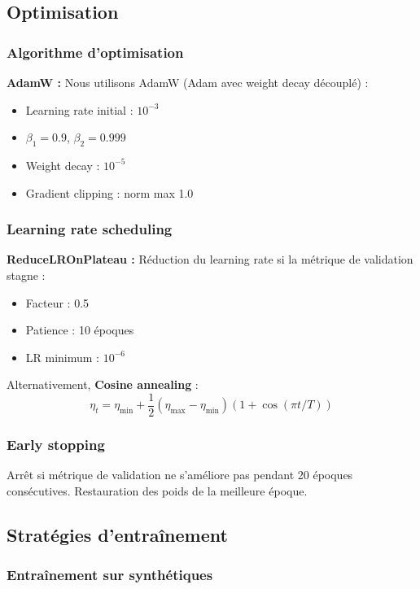 \subsection{Optimisation}

\subsubsection{Algorithme d'optimisation}

\textbf{AdamW :}
Nous utilisons AdamW (Adam avec weight decay découplé) :
\begin{itemize}
    \item Learning rate initial : $10^{-3}$
    \item $\beta_1 = 0.9$, $\beta_2 = 0.999$
    \item Weight decay : $10^{-5}$
    \item Gradient clipping : norm max 1.0
\end{itemize}

\subsubsection{Learning rate scheduling}

\textbf{ReduceLROnPlateau :}
Réduction du learning rate si la métrique de validation stagne :
\begin{itemize}
    \item Facteur : 0.5
    \item Patience : 10 époques
    \item LR minimum : $10^{-6}$
\end{itemize}

Alternativement, \textbf{Cosine annealing} :
\[
\eta_t = \eta_{\min} + \frac{1}{2}(\eta_{\max} - \eta_{\min})(1 + \cos(\pi t / T))
\]

\subsubsection{Early stopping}

Arrêt si métrique de validation ne s'améliore pas pendant 20 époques consécutives. Restauration des poids de la meilleure époque.

\subsection{Stratégies d'entraînement}

\subsubsection{Entraînement sur synthétiques}


